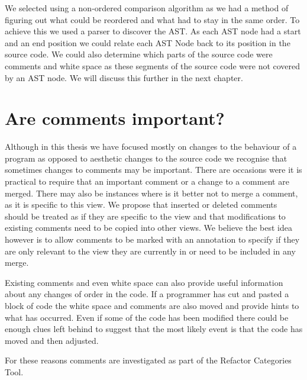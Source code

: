 We selected using a non-ordered comparison algorithm as we had a method of figuring out what could be reordered and what had to stay in the same order.  To achieve this we used a parser to discover the AST.  As each AST node had a start and an end position we could relate each AST Node back to its position in the source code.  We could also determine which parts of the source code were comments and white space as these segments of the source code were not covered by an AST node. We will discuss this further in the next chapter.

\section{Are comments important?}
Although in this thesis we have focused mostly on changes to the behaviour of a program as opposed to aesthetic changes to the source code we recognise that sometimes changes to comments may be important.  There are occasions were it is practical to require that an important comment or a change to a comment are merged.  There may also be instances where is it better not to merge a comment, as it is specific to this view.  We propose that inserted or deleted comments should be treated as if they are specific to the view and that modifications to existing comments need to be copied into other views.  We believe the best idea however is to allow comments to be marked with an annotation to specify if they are only relevant to the view they are currently in or need to be included in any merge. 

Existing comments and even white space can also provide useful information about any changes of order in the code.  If a programmer has cut and pasted a block of code the white space and comments are also moved and provide hints to what has occurred.  Even if some of the code has been modified there could be enough clues left behind to suggest that the most likely event is that the code has moved and then adjusted.

For these reasons comments are investigated as part of the Refactor Categories Tool.

